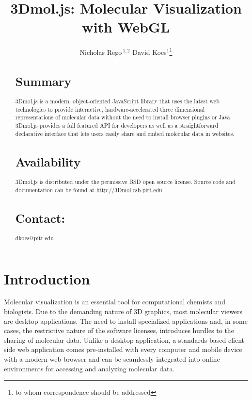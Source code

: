 \documentclass[]{bioinfo}
\begin{document}

\title[3Dmol.js: Molecular Visualization with WebGL]{3Dmol.js: Molecular Visualization with WebGL}
\author[Rego and Koes]{Nicholas Rego\,$^{1,2}$ David Koes$^{1}$\footnote{to whom correspondence should be addressed}}
\address{$^{1}$Department of Computational and Systems Biology, University of Pittsburgh, Pittsburgh, PA 15260\\
$^{2}$Department of Biochemistry and Molecular Biophysics, University of Pennsylvania, Philadelphia, PA 19104}



\maketitle
\begin{abstract}
\section{Summary} 3Dmol.js is a modern, object-oriented JavaScript library that uses the latest web technologies
to provide interactive, hardware-accelerated three dimensional representations of molecular data without the
need to install browser plugins or Java.  3Dmol.js provides a full featured API for developers as well
as a straightforward declarative interface that lets users easily share and embed molecular data in websites.
\section{Availability} 3Dmol.js is distributed under the permissive BSD open source license.
Source code and documentation can be found at \url{http://3Dmol.csb.pitt.edu}
\section{Contact:} \href{dkoes@pitt.edu}{dkoes@pitt.edu}
\end{abstract}

\vspace{-10pt}
\section{Introduction}
Molecular visualization is an essential tool for computational chemists and biologists. Due to the demanding nature of 3D graphics, most molecular viewers are desktop applications.  The need to install specialized applications and, in some cases, the restrictive nature of the software licenses, introduces hurdles to the sharing of molecular data.  Unlike a desktop application, a standards-based client-side web application comes pre-installed with every computer and mobile device with a modern web browser and can be seamlessly integrated into online environments for accessing and analyzing molecular data.
\end{document}
